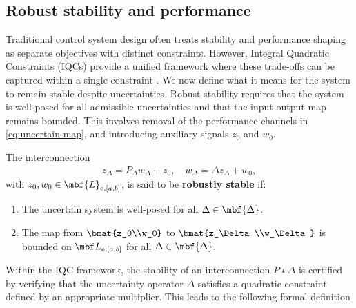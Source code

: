 \subsection{Robust stability and performance}
Traditional control system design often treats stability and performance
shaping as separate objectives with distinct constraints.
However, Integral Quadratic Constraints (IQCs) provide a unified framework where
these trade-offs can be captured within a single constraint \cite{10156335}.
We now define what it means for the system to remain stable despite
uncertainties.
Robust stability requires that the system is well-posed for all admissible
uncertainties and that the input-output map remains bounded.
This involves removal of the performance channels in
\eqref{eq:uncertain-map}, and
introducing auxiliary signals $z_0$ and $w_0$.
\begin{definition}
The interconnection
\begin{align*}
z_\Delta = P_\Delta w_\Delta + z_0, \quad
w_\Delta = \Delta z_\Delta + w_0,
\end{align*}
with $z_0, w_0 \in \mbf{L}_{\mathrm{e},[a,b]}$, is said to be
\textbf{robustly stable} if:
\begin{enumerate}
\item The uncertain system is well-posed for all $\Delta\in\mbf{\Delta}$.
\item The map from $\bmat{z_0\\w_0}$ to
$\bmat{z_\Delta\\w_\Delta}$ is bounded on $\mbf L_{\mathrm{e},[a,b]}$
for all $\Delta\in\mbf{\Delta}$.
\end{enumerate}
\end{definition}
Within the IQC framework, the stability of an interconnection $P\star\Delta$ is
certified by verifying that the uncertainty operator $\Delta$ satisfies a
quadratic constraint defined by an appropriate multiplier.
This leads to the following formal definition
